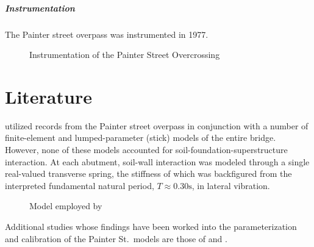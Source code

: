 \subparagraph{Instrumentation}

The Painter street overpass was instrumented in 1977.

%     

\begin{figure}
\hypertarget{fig:painter-instrumentation}{%
\centering
\caption{Instrumentation of the Painter Street Overcrossing}\label{fig:painter-instrumentation}
}
\end{figure}

\section{Literature}

\cite{maroney1990interpretation} utilized records from the Painter street overpass
in conjunction with a number of finite-element and lumped-parameter
(stick) models of the entire bridge. However, none of these models
accounted for soil-foundation-superstructure interaction. At each
abutment, soil-wall interaction was modeled through a single real-valued
transverse spring, the stiffness of which was backfigured from the
interpreted fundamental natural period, \(T \approx 0.30 \text{s}\), in
lateral vibration.





\begin{figure}
\hypertarget{fig:goel1997evaluation-model}{%
\centering
\caption{Model employed by
\textcite{goel1997evaluation}}\label{fig:goel1997evaluation-model}
}
\end{figure}

Additional studies whose findings have been worked into the
parameterization and calibration of the Painter St.~models are those of
\textcite{zhang2001seismic} and \textcite{arici2003system}.

